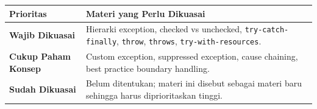 \begin{tabularx}{\textwidth}{|L{0.22\textwidth}|X|}
\hline
\textbf{Prioritas} & \textbf{Materi yang Perlu Dikuasai} \\
\hline
\textbf{Wajib Dikuasai} & Hierarki exception, checked vs unchecked, \texttt{try-catch-finally}, \texttt{throw}, \texttt{throws}, \texttt{try-with-resources}. \\
\hline
\textbf{Cukup Paham Konsep} & Custom exception, suppressed exception, cause chaining, best practice boundary handling. \\
\hline
\textbf{Sudah Dikuasai} & Belum ditentukan; materi ini disebut sebagai materi baru sehingga harus diprioritaskan tinggi. \\
\hline
\end{tabularx}
